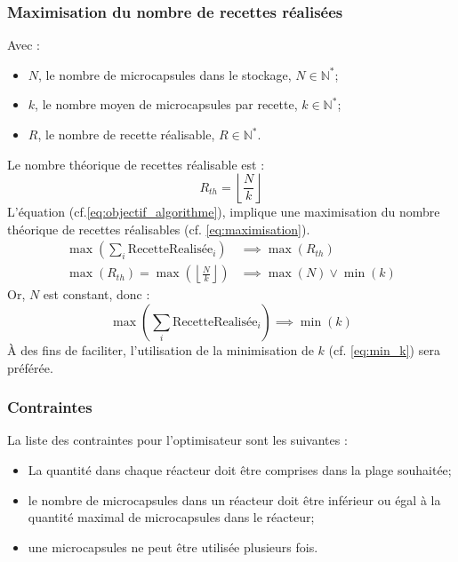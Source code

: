 \subsubsection{Maximisation du nombre de recettes réalisées}
Avec :
\begin{itemize}
    \item $N$, le nombre de \glspl{microcapsule} dans le stockage, $N \in \mathbb{N}^*$;
    \item $k$, le nombre moyen de \glspl{microcapsule} par recette, $k\in \mathbb{N}^*$;
    \item $R$, le nombre de recette réalisable, $R\in \mathbb{N}^*$.
\end{itemize}
Le nombre théorique de recettes réalisable est :
\begin{equation}
   R_{th} = \left\lfloor \frac{N}{k}\right\rfloor
   \label{eq:nbre_recipe_th}
\end{equation}
L'équation (cf.\autoref{eq:objectif_algorithme}), implique une maximisation du nombre théorique de recettes réalisables (cf. \autoref{eq:maximisation}).
\begin{align}
    \max \left(\sum_{i}\text{RecetteRealisée}_i\right) &\implies \max\left(R_{th}\right) 
    \label{eq:maximisation} \\
    \max(R_{th}) = \max\left( \left\lfloor \frac{N}{k}\right\rfloor\right) &\implies \max\left(N\right) \vee \min\left(k\right)
\end{align}
Or, \(N\) est constant, donc :
\begin{equation}
    \max\left( \sum_{i} \text{RecetteRealisée}_i \right) \implies \min\left(k\right)
    \label{eq:min_k}
\end{equation}
À des fins de faciliter, l'utilisation de la minimisation de $k$ (cf. \autoref{eq:min_k}) sera préférée.
\subsubsection{Contraintes}
La liste des contraintes pour l'optimisateur sont les suivantes :
\begin{itemize}
    \item La quantité dans chaque réacteur doit être comprises dans la plage souhaitée;
    \item le nombre de \glspl{microcapsule} dans un réacteur doit être inférieur ou égal à la quantité maximal de \glspl{microcapsule} dans le réacteur;
    \item une \glspl{microcapsule} ne peut être utilisée plusieurs fois.
\end{itemize}
